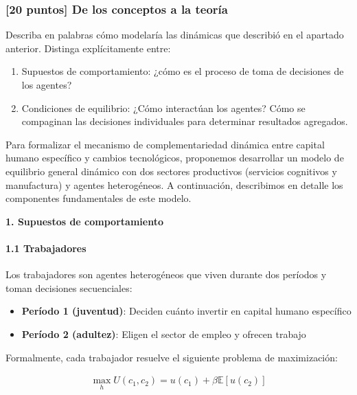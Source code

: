 \documentclass{article}
\theoremstyle{remark}
\theoremstyle{definition}
\begin{document}
\subsubsection{[20 puntos] De los conceptos a la teoría}

Describa en palabras cómo modelaría las dinámicas que describió en el apartado anterior. Distinga explícitamente entre:
\begin{enumerate}
\item Supuestos de comportamiento: ¿cómo es el proceso de toma de decisiones de los agentes?
\item Condiciones de equilibrio: ¿Cómo interactúan los agentes? Cómo se compaginan las decisiones individuales para determinar resultados agregados.
\end{enumerate}

\begin{tcolorbox}

Para formalizar el mecanismo de complementariedad dinámica entre capital humano específico y cambios tecnológicos, proponemos desarrollar un modelo de equilibrio general dinámico con dos sectores productivos (servicios cognitivos y manufactura) y agentes heterogéneos. A continuación, describimos en detalle los componentes fundamentales de este modelo.

\textbf{1. Supuestos de comportamiento}

\paragraph{1.1 Trabajadores}
Los trabajadores son agentes heterogéneos que viven durante dos períodos y toman decisiones secuenciales:

\begin{itemize}
\item \textbf{Período 1 (juventud)}: Deciden cuánto invertir en capital humano específico
\item \textbf{Período 2 (adultez)}: Eligen el sector de empleo y ofrecen trabajo
\end{itemize}

Formalmente, cada trabajador resuelve el siguiente problema de maximización:

\begin{align}
\max_{h} U(c_1, c_2) = u(c_1) + \beta \mathbb{E}[u(c_2)]
\end{align}


\end{tcolorbox}
\end{document}
